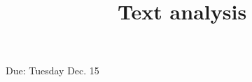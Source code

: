 \documentclass[a4, 12pt]{article}
\title{Text analysis}
\author{}
\date{}
\begin{document}
\maketitle

Due: Tuesday Dec. 15
\end{document}
